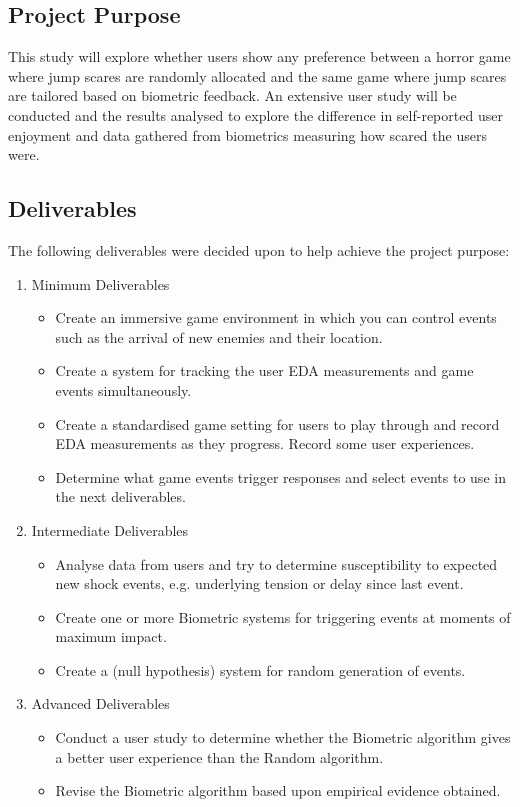 \documentclass[12pt,a4paper]{article}
\begin{document}
\subsection{Project Purpose}
This study will explore whether users show any preference between a horror game where jump scares are randomly allocated and the same game where jump scares are tailored based on biometric feedback. An extensive user study will be conducted and the results analysed to explore the difference in self-reported user enjoyment and data gathered from biometrics measuring how scared the users were.

\subsection{Deliverables}
The following deliverables were decided upon to help achieve the project purpose:
\begin{enumerate}
	\item Minimum Deliverables
	\begin{itemize}
		\item Create an immersive game environment in which you can control events such as the arrival of new enemies and their location.
		\item Create a system for tracking the user EDA measurements and game events simultaneously.
		\item Create a standardised game setting for users to play through and record EDA measurements as they progress. Record some user experiences.
		\item Determine what game events trigger responses and select events to use in the next deliverables.
	\end{itemize}
	
	\item Intermediate Deliverables
	\begin{itemize}
		\item Analyse data from users and try to determine susceptibility to expected new shock events, e.g. underlying tension or delay since last event.
		\item Create one or more Biometric systems for triggering events at moments of maximum impact.
		\item Create a (null hypothesis) system for random generation of events.
	\end{itemize}
	
	\item Advanced Deliverables
	\begin{itemize}
		\item Conduct a user study to determine whether the Biometric algorithm gives a better user experience than the Random algorithm.
		\item Revise the Biometric algorithm based upon empirical evidence obtained.
	\end{itemize}
\end{enumerate}
\end{document}
